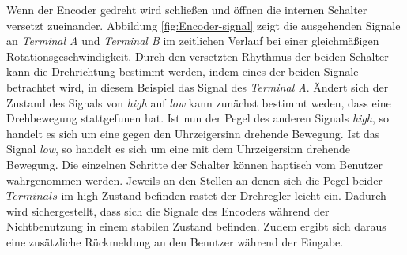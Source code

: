 Wenn der Encoder gedreht wird schließen und öffnen die internen Schalter versetzt zueinander. Abbildung \ref{fig:Encoder-signal} zeigt die ausgehenden Signale an \textit{Terminal A} und \textit{Terminal B} im zeitlichen Verlauf bei einer gleichmäßigen Rotationsgeschwindigkeit. Durch den versetzten Rhythmus der beiden Schalter kann die Drehrichtung bestimmt werden, indem eines der beiden Signale betrachtet wird, in diesem Beispiel das Signal des \textit{Terminal A}. Ändert sich der Zustand des Signals von \textit{high} auf \textit{low} kann zunächst bestimmt weden, dass eine Drehbewegung stattgefunen hat. Ist nun der Pegel des anderen Signals \textit{high}, so handelt es sich um eine gegen den Uhrzeigersinn drehende Bewegung. Ist das Signal \textit{low}, so handelt es sich um eine mit dem Uhrzeigersinn drehende Bewegung. Die einzelnen Schritte der Schalter können haptisch vom Benutzer wahrgenommen werden. Jeweils an den Stellen an denen sich die Pegel beider $Terminals$ im high-Zustand befinden rastet der Drehregler leicht ein. Dadurch wird sichergestellt, dass sich die Signale des Encoders während der Nichtbenutzung in einem stabilen Zustand befinden. Zudem ergibt sich daraus eine zusätzliche Rückmeldung an den Benutzer während der Eingabe.\\
